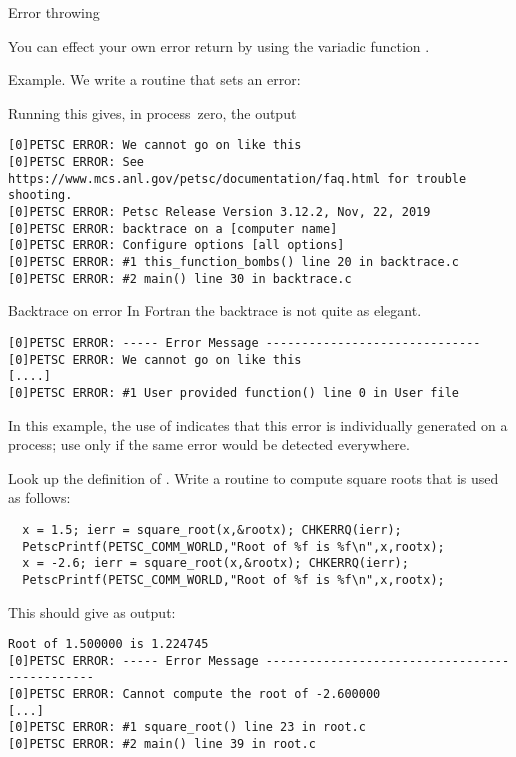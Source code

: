  {Error throwing}

You can effect your own error return by using
the variadic function .

Example. We write a routine that sets an error:

Running this gives, in process~zero, the output
\begin{verbatim}
[0]PETSC ERROR: We cannot go on like this
[0]PETSC ERROR: See https://www.mcs.anl.gov/petsc/documentation/faq.html for trouble shooting.
[0]PETSC ERROR: Petsc Release Version 3.12.2, Nov, 22, 2019
[0]PETSC ERROR: backtrace on a [computer name]
[0]PETSC ERROR: Configure options [all options]
[0]PETSC ERROR: #1 this_function_bombs() line 20 in backtrace.c
[0]PETSC ERROR: #2 main() line 30 in backtrace.c  
\end{verbatim}

\begin{fortrannote}{Backtrace on error}
  In Fortran the backtrace is not quite as elegant.
\begin{verbatim}
[0]PETSC ERROR: ----- Error Message ------------------------------
[0]PETSC ERROR: We cannot go on like this
[....]
[0]PETSC ERROR: #1 User provided function() line 0 in User file
\end{verbatim}
\end{fortrannote}

\begin{remark}
  In this example, the use of  indicates
  that this error is individually generated on a process;
  use  only if the same error would
  be detected everywhere.
\end{remark}

\begin{exercise}
  Look up the definition of .
  Write a routine to compute square roots that is used as follows:
\begin{lstlisting}
  x = 1.5; ierr = square_root(x,&rootx); CHKERRQ(ierr);
  PetscPrintf(PETSC_COMM_WORLD,"Root of %f is %f\n",x,rootx);
  x = -2.6; ierr = square_root(x,&rootx); CHKERRQ(ierr);
  PetscPrintf(PETSC_COMM_WORLD,"Root of %f is %f\n",x,rootx);
\end{lstlisting}
This should give as output:
\begin{verbatim}
Root of 1.500000 is 1.224745
[0]PETSC ERROR: ----- Error Message ----------------------------------------------
[0]PETSC ERROR: Cannot compute the root of -2.600000
[...]
[0]PETSC ERROR: #1 square_root() line 23 in root.c
[0]PETSC ERROR: #2 main() line 39 in root.c
\end{verbatim}

\end{exercise}

